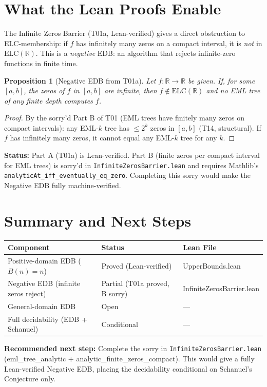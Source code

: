 \documentclass[11pt]{article}
\newtheorem{proposition}[theorem]{Proposition}
\begin{document}
\section{What the Lean Proofs Enable}

The Infinite Zeros Barrier (T01a, Lean-verified) gives a direct obstruction to
ELC-membership: if $f$ has infinitely many zeros on a compact interval, it is
\emph{not} in $\text{ELC}(\mathbb{R})$. This is a \emph{negative} EDB: an algorithm
that rejects infinite-zero functions in finite time.

\begin{proposition}[Negative EDB from T01a]
Let $f : \mathbb{R} \to \mathbb{R}$ be given. If, for some $[a,b]$, the zeros of $f$
in $[a,b]$ are infinite, then $f \notin \text{ELC}(\mathbb{R})$ and no EML tree
of any finite depth computes $f$.
\end{proposition}

\begin{proof}
By the sorry'd Part B of T01 (EML trees have finitely many zeros on compact intervals):
any EML-$k$ tree has $\leq 2^k$ zeros in $[a,b]$ (T14, structural). If $f$ has
infinitely many zeros, it cannot equal any EML-$k$ tree for any $k$.
\end{proof}

\noindent\textbf{Status:} Part A (T01a) is Lean-verified. Part B (finite zeros per
compact interval for EML trees) is sorry'd in \texttt{InfiniteZerosBarrier.lean}
and requires Mathlib's \texttt{analyticAt\_iff\_eventually\_eq\_zero}. Completing
this sorry would make the Negative EDB fully machine-verified.

\section{Summary and Next Steps}

\begin{center}
\begin{tabular}{lll}
\toprule
Component & Status & Lean File \\
\midrule
Positive-domain EDB ($B(n) = n$) & Proved (Lean-verified) & UpperBounds.lean \\
Negative EDB (infinite zeros reject) & Partial (T01a proved, B sorry) & InfiniteZerosBarrier.lean \\
General-domain EDB & Open & --- \\
Full decidability (EDB + Schanuel) & Conditional & --- \\
\bottomrule
\end{tabular}
\end{center}

\noindent\textbf{Recommended next step:} Complete the sorry in
\texttt{InfiniteZerosBarrier.lean} (eml\_tree\_analytic + analytic\_finite\_zeros\_compact).
This would give a fully Lean-verified Negative EDB, placing the decidability
conditional on Schanuel's Conjecture only.
\end{document}
